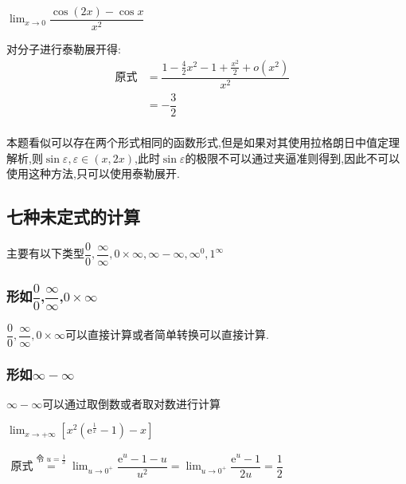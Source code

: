\documentclass[10pt, a4paper, oneside, UTF8]{ctexbook}
\begin{document}
\begin{sloppypar}
    \begin{problem}
        $\lim_{x\to 0}\dfrac{\cos(2x)-\cos x}{x^2}$
    \end{problem}
    \begin{solution}
        对分子进行泰勒展开得:
        \begin{align*}
            \text{原式} & = \dfrac{1-\frac{4}{2}x^2-1+\frac{x^2}{2}+o(x^2)}{x^2} & \\
            & = -\dfrac{3}{2} & \\
        \end{align*}
    \end{solution}
    \begin{note}
        本题看似可以存在两个形式相同的函数形式,但是如果对其使用拉格朗日中值定理解析,则$\sin \varepsilon,\varepsilon \in (x,2x)$,此时$\sin \varepsilon$的极限不可以通过夹逼准则得到,因此不可以使用这种方法,只可以使用泰勒展开.
    \end{note}
    \subsection{七种未定式的计算}
    主要有以下类型$\dfrac{0}{0},\dfrac{\infty}{\infty},0 \times \infty,\infty -\infty,\infty ^0,1^\infty$
    \subsubsection{形如$\dfrac{0}{0}$,$\dfrac{\infty}{\infty}$,$0 \times \infty$}
         $\dfrac{0}{0},\dfrac{\infty}{\infty},0 \times \infty$可以直接计算或者简单转换可以直接计算.
    \subsubsection{形如$\infty -\infty$}
          $\infty -\infty$可以通过取倒数或者取对数进行计算
              \begin{problem}
              $\lim_{x\to+\infty}\left[x^2\left(\mathrm{e}^{\frac{1}{x}}-1\right)-x\right]$
              \end{problem}
              \begin{solution}
                  $
                      \begin{aligned}
                          \text{原式}\overset{\text{令 }u=\frac1x}{\operatorname*{=}}\lim_{u\to0^+}\dfrac{\mathrm{e}^u-1-u}{u^2}=\lim_{u\to0^+}\dfrac{\mathrm{e}^u-1}{2u}=\dfrac12
                      \end{aligned}
                  $
              \end{solution}

\end{sloppypar}
\end{document}
